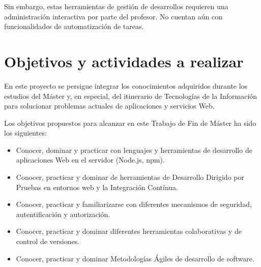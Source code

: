 Sin embargo, estas herramientas de gestión de desarrollos requieren una administración interactiva por parte del profesor. No cuentan aún con funcionalidades de automatización de tareas.

\section{Objetivos y actividades a realizar}
\label{1:sec:3}

En este proyecto se persigue integrar los conocimientos adquiridos durante los estudios del Máster y,
en especial, del itinerario de Tecnologías de la Información para solucionar problemas actuales de aplicaciones y servicios Web.

Los objetivos propuestos para alcanzar en este Trabajo de Fin de Máster ha sido los siguientes:
\begin{itemize}
  \item Conocer, dominar y practicar con lenguajes y herramientas de desarrollo de aplicaciones Web
    en el servidor (Node.js, npm).
  \item Conocer, practicar y dominar de herramientas de Desarrollo Dirigido por Pruebas en entornos
web y la Integración Contínua.
  \item Conocer, practicar y familiarizarse con diferentes mecanismos de seguridad, autentificación
y autorización.
  \item Conocer, practicar y dominar diferentes herramientas colaborativas y de control de versiones.
  \item Conocer, practicar y dominar Metodologías Ágiles de desarrollo de software.
\end{itemize}
\bigskip

